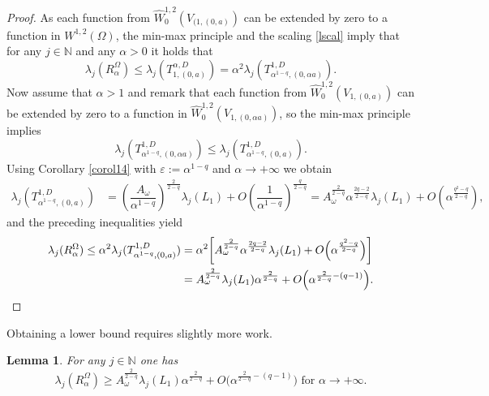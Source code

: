 \documentclass[11pt,oneside,reqno,a4paper]{amsart}
\renewcommand{\Hat}{\widehat}
\newcommand{\N}{\mathbb{N}}
\newcommand{\eps}{\varepsilon}
\newtheorem{lemma}[theorem]{Lemma}
\theoremstyle{definition}
\begin{document}
\begin{proof}
As each function from $\widehat W^{1,2}_0(V_{(1,(0,a)})$ can be extended by zero to a function in $W^{1,2}(\Omega)$, the min-max principle and the scaling \eqref{lscal} imply that for any $j\in\N$ and any $\alpha>0$ it holds that
	\[
	\lambda_j(R^\Omega_\alpha)\le \lambda_j(T^{\alpha,D}_{1,(0,a)})=\alpha^2 \lambda_j(T^{1,D}_{\alpha^{1-q},(0,\alpha a)}).
	\]
Now assume that $\alpha>1$ and remark that each function from $\Hat W^{1,2}_0(V_{1,(0,a)})$
can be extended by zero to a function in 		$\Hat W^{1,2}_0(V_{1,(0,\alpha a)})$,
so the min-max principle implies
\[
\lambda_j(T^{1,D}_{\alpha^{1-q},(0,\alpha a)})\le \lambda_j(T^{1,D}_{\alpha^{1-q},(0,a)}).
\]
Using Corollary \ref{corol14} with $\eps:=\alpha^{1-q}$ and $\alpha\to+\infty$ we obtain
\begin{align*}
\lambda_j(T^{1,D}_{\alpha^{1-q},(0,a)})&=\left(\dfrac{A_\omega}{\alpha^{1-q}}\right)^{\frac{2}{2-q}}\lambda_j(L_1)+O\left(\dfrac{1}{\alpha^{1-q}}\right)^{\frac{q}{2-q}}
=A_\omega^\frac{2}{2-q}\alpha^\frac{2q-2}{2-q}\lambda_j(L_1)+O\left(\alpha^{\frac{q^2-q}{2-q}}\right),
\end{align*}
and the preceding inequalities yield
\begin{align*}
	\lambda_j(R^\Omega_\alpha)\le \alpha^2 \lambda_j(T^{1,D}_{\alpha^{1-q},(0,a)})&=\alpha^2\bigg[ A_\omega^\frac{2}{2-q}\alpha^\frac{2q-2}{2-q}\lambda_j(L_1)+O\Big(\alpha^{\frac{q^2-q}{2-q}}\Big)\bigg]\\
	&=A_\omega^\frac{2}{2-q} \lambda_j(L_1) \alpha^\frac{2}{2-q}+O\Big(\alpha^{\frac{2}{2-q}-(q-1)}\Big). \qedhere
\end{align*}
\end{proof}


Obtaining a lower bound requires slightly more work.	
\begin{lemma}\label{lem16}	For any $j\in\N$ one has
	\[
	\lambda_j(R^\Omega_\alpha)\ge A_\omega^\frac{2}{2-q} \lambda_j(L_1) \alpha^\frac{2}{2-q}+O\Big(\alpha^{\frac{2}{2-q}-(q-1)}\Big)\text{ for $\alpha\to +\infty$.}
	\]
\end{lemma}	
\end{document}
